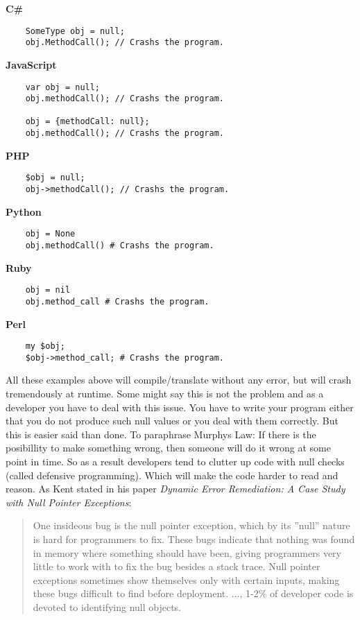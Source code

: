 \documentclass[a4paper,12pt]{article}
\begin{document}
\textbf{C\#}
\begin{verbatim}
    SomeType obj = null;
    obj.MethodCall(); // Crashs the program.
\end{verbatim}

\textbf{JavaScript}
\begin{verbatim}
    var obj = null;
    obj.methodCall(); // Crashs the program.

    obj = {methodCall: null};
    obj.methodCall(); // Crashs the program.
\end{verbatim}

\textbf{PHP}
\begin{verbatim}
    $obj = null;
    obj->methodCall(); // Crashs the program.    
\end{verbatim}

\textbf{Python}
\begin{verbatim}
    obj = None
    obj.methodCall() # Crashs the program.
\end{verbatim}

\textbf{Ruby}
\begin{verbatim}
    obj = nil
    obj.method_call # Crashs the program.
\end{verbatim}

\textbf{Perl}
\begin{verbatim}
    my $obj;
    $obj->method_call; # Crashs the program.    
\end{verbatim}

All these examples above will compile/translate without any error, but will crash tremendously at runtime. Some might say this is not the problem and as a developer you have to deal with this issue. You have to write your program either that you do not produce such null values or you deal with them correctly. But this is easier said than done. To paraphrase Murphys Law: If there is the posibillity to make something wrong, then someone will do it wrong at some point in time. So as a result developers tend to clutter up code with null checks (called defensive programming). Which will make the code harder to read and reason. As Kent\cite{kent-dyn-err-remediation} stated in his paper \textit{Dynamic Error Remediation: A Case Study with Null Pointer Exceptions}:

\begin{quotation}
    One insideous bug is the null pointer exception, which by its ”null” nature is hard for programmers to fix. These bugs indicate that nothing was found in memory where something should have been, giving programmers very little to work with to fix the bug besides a stack trace. Null pointer exceptions sometimes show themselves only with certain inputs, making these bugs difficult to find before deployment. ..., 1-2\% of developer code is devoted to identifying null objects.
\end{quotation}
\end{document}
